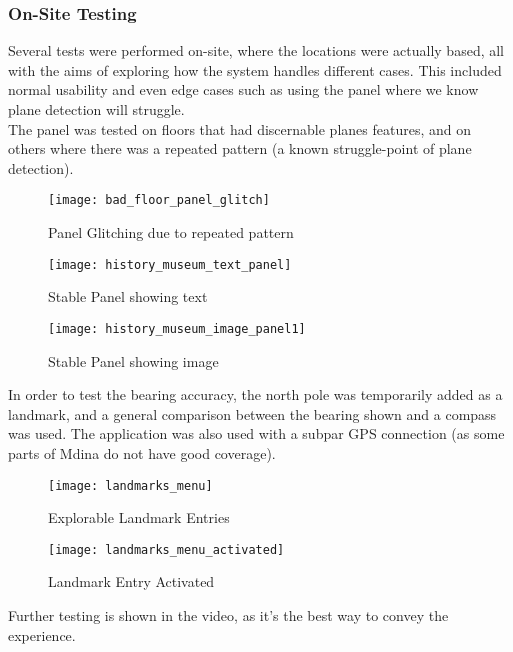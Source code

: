 \subsubsection{On-Site Testing}
Several tests were performed on-site, where the locations were actually based, all with the aims of exploring how the system handles different cases. 
This included normal usability and even edge cases such as using the panel where we know plane detection will struggle.
\\
The panel was tested on floors that had discernable planes features, and on others where there was a repeated pattern (a known struggle-point of plane detection).\\
\begin{figure}[!htb]
        \texttt{[image: bad\_floor\_panel\_glitch]}
            \caption{Panel Glitching due to repeated pattern}
            \label{fig:bad_panel}
    \endminipage\hfill
        \texttt{[image: history\_museum\_text\_panel]}
        \caption{Stable Panel showing text}
        \label{fig:panel_text}
    \endminipage\hfill
        \texttt{[image: history\_museum\_image\_panel1]}
        \caption{Stable Panel showing image}
        \label{fig:panel_img}
    \endminipage
    \end{figure}

\noindent
In order to test the  bearing accuracy, the north pole was temporarily added as a landmark, and a general comparison between the bearing shown and a compass was used.
The application was also used with a subpar GPS connection (as some parts of Mdina do not have good coverage).

\begin{figure}[!htb]
        \texttt{[image: landmarks\_menu]}
            \caption{Explorable Landmark Entries}
            \label{fig:explor_lands}
    \endminipage\hfill
        \texttt{[image: landmarks\_menu\_activated]}
        \caption{Landmark Entry Activated}
        \label{fig:active_land}
    \endminipage
    \end{figure}
\noindent
Further testing is shown in the video, as it's the best way to convey the experience.
